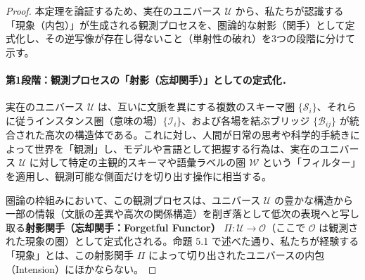 \documentclass[11pt,a4paper,luatex]{jlreq}
\theoremstyle{definition}
\theoremstyle{plain}
\begin{document}
\begin{proof}
本定理を論証するため、実在のユニバース $\mathcal{U}$ から、私たちが認識する「現象（内包）」が生成される観測プロセスを、圏論的な射影（関手）として定式化し、その逆写像が存在し得ないこと（単射性の破れ）を3つの段階に分けて示す。

\paragraph{第1段階：観測プロセスの「射影（忘却関手）」としての定式化．}
実在のユニバース $\mathcal{U}$ は、互いに文脈を異にする複数のスキーマ圏 $\{\mathcal{S}_i\}$、それらに従うインスタンス圏（意味の場）$\{\mathcal{I}_i\}$、および各場を結ぶブリッジ $\{\mathcal{B}_{ij}\}$ が統合された高次の構造体である。これに対し、人間が日常の思考や科学的手続きによって世界を「観測」し、モデルや言語として把握する行為は、実在のユニバース $\mathcal{U}$ に対して特定の主観的スキーマや語彙ラベルの圏 $\mathcal{W}$ という「フィルター」を適用し、観測可能な側面だけを切り出す操作に相当する。

圏論の枠組みにおいて、この観測プロセスは、ユニバース $\mathcal{U}$ の豊かな構造から一部の情報（文脈の差異や高次の関係構造）を削ぎ落として低次の表現へと写し取る\textbf{射影関手（忘却関手：Forgetful Functor）} $\Pi: \mathcal{U} \to \mathcal{O}$（ここで $\mathcal{O}$ は観測された現象の圏）として定式化される。命題 5.1 で述べた通り、私たちが経験する「現象」とは、この射影関手 $\Pi$ によって切り出されたユニバースの内包（Intension）にほかならない。


\end{proof}
\end{document}
